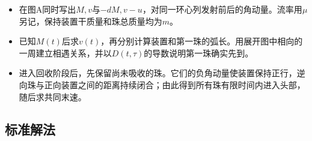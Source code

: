\documentclass[UTF8,fontset=fandol,a4paper,11pt]{ctexart}
\begin{document}
\begin{itemize}
\item 在图A同时写出$M,v$与$-dM,v-u$，对同一环心列发射前后的角动量。流率用$\mu$另记，保持装置干质量和珠总质量均为$m$。
\item 已知$M(t)$后求$v(t)$，再分别计算装置和第一珠的弧长。用展开图中相向的一周建立相遇关系，并以$D(t,\tau)$的导数说明第一珠确实先到。
\item 进入回收阶段后，先保留尚未吸收的珠。它们的负角动量使装置保持正行，逆向珠与正向装置之间的距离持续闭合；由此得到所有珠有限时间内进入头部，随后求共同末速。
\end{itemize}



\subsection*{标准解法}
\end{document}
